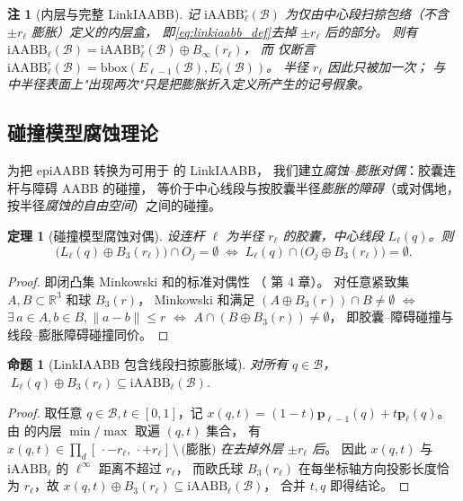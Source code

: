 \documentclass[journal]{IEEEtran}
\newtheorem{theorem}{定理}
\newtheorem{proposition}{命题}
\newtheorem{remark}{注}
\newcommand{\iAABB}{\mathrm{iAABB}}
\newcommand{\Real}{\mathbb{R}}
\begin{document}
\begin{remark}[内层与完整 LinkIAABB]\label{rem:iaabb_inner}
记 $\iAABB_\ell^\circ(\mathcal{B})$ 为仅由中心段扫掠包络（不含 $\pm r_\ell$ 膨胀）定义的\emph{内层}盒，
即\eqref{eq:linkiaabb_def}去掉 $\pm r_\ell$ 后的部分。
则有 $\iAABB_\ell(\mathcal{B}) = \iAABB_\ell^\circ(\mathcal{B}) \oplus B_\infty(r_\ell)$，
而  仅断言
$\iAABB_\ell^\circ(\mathcal{B}) = \mathrm{bbox}(E_{\ell-1}(\mathcal{B}), E_\ell(\mathcal{B}))$。
半径 $r_\ell$ 因此\emph{只被加一次}； 与 
中半径表面上"出现两次"只是把膨胀折入定义所产生的记号假象。
\end{remark}

\subsection{碰撞模型腐蚀理论}\label{sec:erosion}

为把 epiAABB 转换为可用于  的 LinkIAABB，
我们建立\emph{腐蚀--膨胀对偶}：胶囊连杆与障碍 AABB 的碰撞，
等价于中心线段与按胶囊半径\emph{膨胀的障碍}（或对偶地，按半径\emph{腐蚀的自由空间}）之间的碰撞。

\begin{theorem}[碰撞模型腐蚀对偶]\label{thm:erosion}
设连杆 $\ell$ 为半径 $r_\ell$ 的胶囊，中心线段 $L_\ell(q)$。则
\begin{equation}\label{eq:erosion}
\bigl(L_\ell(q)\oplus B_3(r_\ell)\bigr)\cap O_j=\emptyset
\;\Longleftrightarrow\;
L_\ell(q)\cap\bigl(O_j\oplus B_3(r_\ell)\bigr)=\emptyset.
\end{equation}
\end{theorem}

\begin{proof}
即闭凸集 Minkowski 和的标准对偶性
（\cite{ericson2004real} 第 4 章）。
对任意紧致集 $A,B\subset\Real^3$ 和球 $B_3(r)$，
Minkowski 和满足
$(A\oplus B_3(r))\cap B \neq\emptyset$
$\Leftrightarrow$ $\exists\,a\in A,b\in B,\|a-b\|\leq r$
$\Leftrightarrow$ $A\cap(B\oplus B_3(r))\neq\emptyset$，
即胶囊--障碍碰撞与线段--膨胀障碍碰撞同价。
\end{proof}

\begin{proposition}[LinkIAABB 包含线段扫掠膨胀域]
\label{prop:iaabb_contains}
对所有 $q\in\mathcal{B}$，
$\;L_\ell(q)\oplus B_3(r_\ell)\subseteq\iAABB_\ell(\mathcal{B})$.
\end{proposition}

\begin{proof}
取任意 $q\in\mathcal{B},t\in[0,1]$，记
$x(q,t)=(1-t)\bm{p}_{\ell-1}(q)+t\bm{p}_\ell(q)$。
由  的内层 $\min/\max$ 取遍 $(q,t)$ 集合，
有 $x(q,t)\in\prod_d[\,\cdot-r_\ell,\,\cdot+r_\ell]\,\setminus\,\text{(膨胀)}$
\emph{在去掉外层 $\pm r_\ell$ 后}。
因此 $x(q,t)$ 与 $\iAABB_\ell$ 的 $\ell^\infty$ 距离不超过 $r_\ell$，
而欧氏球 $B_3(r_\ell)$ 在每坐标轴方向投影长度恰为 $r_\ell$，故
$x(q,t)\oplus B_3(r_\ell)\subseteq\iAABB_\ell(\mathcal{B})$，
合并 $t,q$ 即得结论。
\end{proof}
\end{document}
